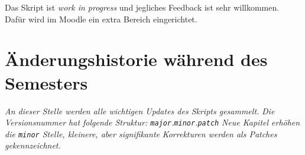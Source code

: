 \documentclass[]{book}
\begin{document}
Das Skript ist \emph{work in progress} und jegliches Feedback ist sehr
willkommen. Dafür wird im Moodle ein extra Bereich eingerichtet.

\section*{Änderungshistorie während des
Semesters}\label{anderungshistorie-wahrend-des-semesters}

\emph{An dieser Stelle werden alle wichtigen Updates des Skripts
gesammelt.} \emph{Die Versionsnummer hat folgende Struktur:
\texttt{major}.\texttt{minor}.\texttt{patch}} \emph{Neue Kapitel erhöhen
die \texttt{minor} Stelle, kleinere, aber signifikante}
\emph{Korrekturen werden als Patches gekennzeichnet.}
\end{document}

